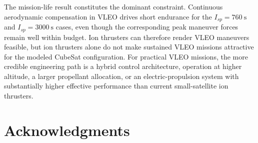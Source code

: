 \documentclass[conf]{new-aiaa}
\begin{document}
The mission-life result constitutes the dominant constraint. Continuous aerodynamic compensation in VLEO drives short endurance for the $I_{sp}=\SI{760}{\second}$ and $I_{sp}=\SI{3000}{\second}$ cases, even though the corresponding peak maneuver forces remain well within budget. Ion thrusters can therefore render VLEO maneuvers feasible, but ion thrusters alone do not make sustained VLEO missions attractive for the modeled CubeSat configuration. For practical VLEO missions, the more credible engineering path is a hybrid control architecture, operation at higher altitude, a larger propellant allocation, or an electric-propulsion system with substantially higher effective performance than current small-satellite ion thrusters.

\section*{Acknowledgments}



\end{document}
